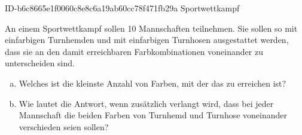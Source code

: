 \begin{exercise}
      {ID-b6c8665e1f0060c8e8c6a19ab60cc78f471fb29a}
      {Sportwettkampf}
  \ifproblem\problem\par
    An einem Sportwettkampf sollen 10 Mannschaften teilnehmen. Sie sollen
    so mit einfarbigen Turnhemden und mit einfarbigen Turnhosen ausgestattet
    werden, dass sie an den damit erreichbaren Farbkombinationen voneinander
    zu unterscheiden sind.
    \begin{enumerate}[a)]
      \item Welches ist die kleinste Anzahl von Farben, mit der das zu
            erreichen ist?
      \item Wie lautet die Antwort, wenn zusätzlich verlangt wird, dass bei
            jeder Mannschaft die beiden Farben von Turnhemd und Turnhose
            voneinander verschieden seien sollen?
    \end{enumerate}
  \fi
\end{exercise}
